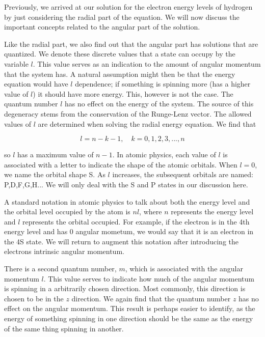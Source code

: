 \documentclass[letter,12pt]{article}
\begin{document}
        Previously, we arrived at our solution for the electron energy 
		levels
        of hydrogen by just considering the radial part of the
        equation. We will now discuss the important concepts related
        to the angular part of the solution. 
        
        Like the radial part, 
        we also find out that the angular part has solutions that 
        are quantized. We denote these discrete values that a state
		can occupy by the variable $l$. This value serves as an
		indication to the amount of angular momentum that the 
		system has. A natural assumption might then be that
		the energy equation would have $l$ dependence; if 
		something is spinning more (has a higher value 
		of $l$) it should have more energy. This, however is not
		the case. The quantum number $l$ has no effect on the 
		energy of the system. The source of this degeneracy stems from 
		the conservation of the Runge-Lenz vector.
		The allowed values of $l$ are determined when solving
		the radial energy equation. We find that

		\begin{equation}
			l=n-k-1,\quad k=0,1,2,3,...,n
		\end{equation}

		so $l$ has a maximum value of $n-1$. In atomic physics, 
		each value of $l$ is associated with a letter to indicate
		the shape of the atomic orbitals. When $l=0$, we name the 
		orbital shape S. As $l$ increases, the subsequent orbitals
		are named: P,D,F,G,H... We will only deal with the S and P 
		states in our discussion here. 

		A standard notation in atomic physics 
        to talk about both the energy level and
		the orbital level occupied by the atom is $nl$, where $n$
		represents the energy level and $l$ represents the orbital
		occupied. For example, if the electron is in the 4th energy
		level and has 0 angular mometum, we would say that it is
		an electron in the 4S state. We will return to augment this 
		notation after introducing the electrons intrinsic angular
		momentum.

		There is a second quantum number, $m$, which is associated 
		with the angular momentum $l$. This value serves to indicate
		how much of the angular momentum is spinning in a arbitrarily
		chosen direction. Most commonly, this direction is chosen
		to be in the $z$ direction. We again find that the quantum
        number $z$ has no effect on the angular momentum. This result
        is perhaps easier to identify, as the energy of something 
        spinning in one direction should be the same as the energy 
        of the same thing spinning in another. 
\end{document}
